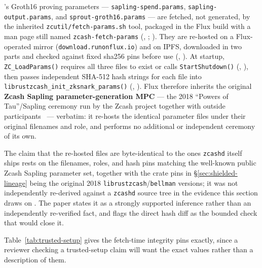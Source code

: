 \begin{assumption}
\fluxd's Groth16 proving parameters — \texttt{sapling-spend.\allowbreak{}params}, \texttt{sapling-output.\allowbreak{}params},
and \texttt{sprout-groth16.\allowbreak{}params} — are fetched, not generated, by the inherited
\texttt{zcutil/\allowbreak{}fetch-params.\allowbreak{}sh} tool, packaged in the Flux build with a man page still named
\texttt{zcash-\allowbreak{}fetch-\allowbreak{}params} (\shipped, ; ).
They are re-hosted on a Flux-operated mirror (\texttt{download.\allowbreak{}runonflux.\allowbreak{}io}) and on IPFS, downloaded
in two parts and checked against fixed sha256 pins before use (\shipped,
). At startup, \texttt{ZC\_Load\allowbreak{}Params()}
requires all three files to exist or calls \texttt{Start\allowbreak{}Shutdown()} (\shipped,
), then passes independent SHA-512 hash strings for each
file into \texttt{librustzcash\_init\_zksnark\_params()} (\shipped,
). Flux therefore inherits the original \textbf{Zcash Sapling
parameter-generation MPC} — the 2018 ``Powers of Tau''/Sapling ceremony run by the Zcash project
together with outside participants~\citep{bowe2017mpc} — verbatim: it re-hosts the identical
parameter files under their original filenames and role, and performs no additional or independent
ceremony of its own.
\end{assumption}

The claim that the re-hosted files are byte-identical to the ones \texttt{zcashd} itself ships rests
on the filenames, roles, and hash pins matching the well-known public Zcash Sapling parameter set,
together with the crate pins in \S\ref{sec:shielded-lineage} being the original 2018 \texttt{librustzcash}\slash\texttt{bellman}
versions; it was not independently re-derived against a \texttt{zcashd} source tree in the evidence
this section draws on \srcinferred. The paper states it as a strongly supported inference rather than
an independently re-verified fact, and flags the direct hash diff as the bounded check that would
close it.

Table~\ref{tab:trusted-setup} gives the fetch-time integrity pins exactly, since a reviewer checking a
trusted-setup claim will want the exact values rather than a description of them.

